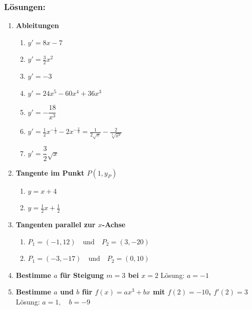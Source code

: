 \subsubsection*{Lösungen:}
\begin{enumerate}
    \item \textbf{Ableitungen}
          \begin{enumerate}
              \item \( y' = 8x - 7 \)
              \item \( y' = \frac{3}{2}x^2 \)
              \item \( y' = -3 \)
              \item \( y' = 24x^5-60x^4+36x^3 \)
              \item \( y' = -\dfrac{18}{x^3} \)
              \item \( y' = \frac{1}{2} x^{-\frac{1}{2} } - 2x^{-\frac{2}{3}} = \frac{1}{2\sqrt{x}} - \frac{2}{\sqrt[3]{x^2}} \)
              \item \( y' = \dfrac{3}{2} \sqrt{x} \)
          \end{enumerate}

    \item \textbf{Tangente im Punkt \( P(1, y_P) \)}
          \begin{enumerate}
              \item \( y = x + 4 \)
              \item \( y = \frac{1}{2} x + \frac{1}{2} \)
          \end{enumerate}

    \item \textbf{Tangenten parallel zur \( x \)-Achse}
          \begin{enumerate}
              \item \( P_1 =( -1, 12) \quad \text{und} \quad P_2 = (3,-20) \)
              \item \( P_1 = (-3,-17) \quad \text{und} \quad P_2= (0, 10) \)
          \end{enumerate}


    \item \textbf{Bestimme \( a \) für Steigung \( m = 3 \) bei \( x = 2 \)}
          Lösung: \( a = -1 \)

    \item \textbf{Bestimme \( a \) und \( b \) für \( f(x) = ax^3 + bx \) mit \( f(2) = -10 \), \( f'(2) = 3 \)}
          Lösung: \( a = 1, \quad b = -9 \)
\end{enumerate}
\clearpage

